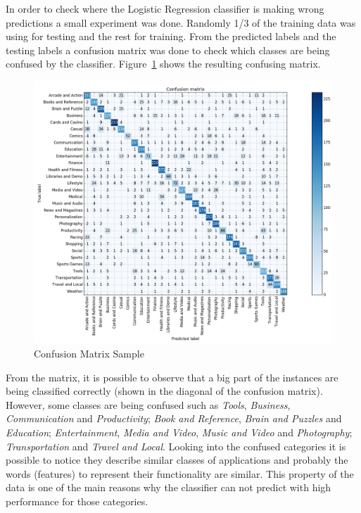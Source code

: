 \documentclass[letterpaper,10pt]{article}
\theoremstyle{mytheor}
\begin{document}
In order to check where the Logistic Regression classifier is making wrong predictions a small experiment was done. Randomly 1/3 of the training data was using for testing and the rest for training. From the predicted labels and the testing labels a confusion matrix was done to check which classes are being confused by the classifier. Figure~\ref{fig:4} shows the resulting confusing matrix.

\begin{figure}[H]
\includegraphics[width=\textwidth]{cm}
\centering
\caption{Confusion Matrix Sample}
\label{fig:4}
\end{figure}

From the matrix, it is possible to observe that a big part of the instances are being classified correctly (shown in the diagonal of the confusion matrix). However, some classes are being confused such as \textit{Tools}, \textit{Business}, \textit{Communication} and \textit{Productivity}; \textit{Book and Reference}, \textit{Brain and Puzzles} and \textit{Education}; \textit{Entertainment}, \textit{Media and Video}, \textit{Music and Video} and \textit{Photography}; \textit{Transportation} and \textit{Travel and Local}. Looking into the confused categories it is possible to notice they describe similar classes of applications and probably the words (features) to represent their functionality are similar. This property of the data is one of the main reasons why the classifier can not predict with high performance for those categories.    
\end{document}
